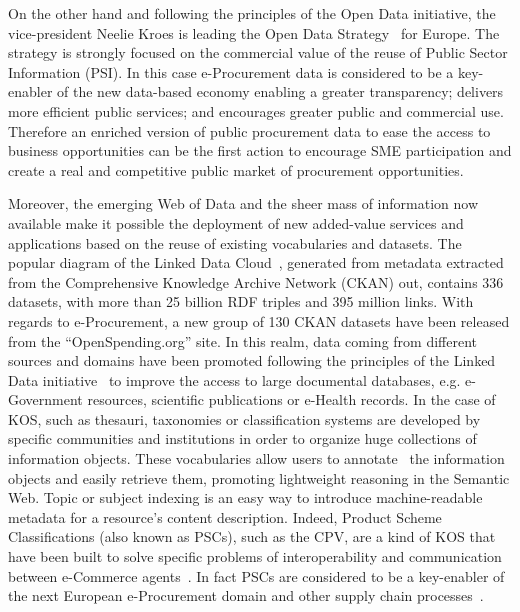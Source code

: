 On the other hand and following the principles of the Open Data initiative, the vice-president Neelie Kroes is 
leading the Open Data Strategy~\cite{d2003} for Europe. The strategy is strongly focused on the commercial 
value of the reuse of Public Sector Information (PSI). In this case e-Procurement data is considered to be 
a key-enabler of the new data-based economy enabling a greater transparency; delivers more efficient public services; and encourages 
greater public and commercial use. Therefore an enriched version of public procurement data to ease the access 
to business opportunities can be the first action to encourage SME participation and create a real and competitive 
public market of procurement opportunities. 


Moreover, the emerging Web of Data and the sheer mass of information now available make it possible the deployment of new 
added-value services and applications based on the reuse of existing vocabularies and datasets. 
The popular diagram of the Linked Data Cloud~\cite{linked-data-cloud}, generated from metadata extracted from the 
Comprehensive Knowledge Archive Network (CKAN) out, contains $336$ datasets, with more than 25 billion RDF triples and 395 million links. 
With regards to e-Procurement, a new group of 130 CKAN datasets have been released from the ``OpenSpending.org'' site. In this realm, 
data coming from different sources and domains have been promoted following the principles of the 
Linked Data initiative~\cite{Berners-Lee-2006} to improve the access to large documental databases, 
e.g. e-Government resources, scientific publications or e-Health records. In the case of KOS, such as thesauri, taxonomies or classification systems 
are developed by specific communities and institutions in order to organize huge collections of information objects. 
These vocabularies allow users to annotate~\cite{Leukel-standard,Leukel-automating,Leukel-comparative} the information objects and easily retrieve them, 
promoting lightweight reasoning in the Semantic Web. Topic or subject indexing is an easy way to introduce machine-readable metadata for a resource's content 
description. Indeed, Product Scheme Classifications (also known as PSCs), such as the CPV, are a kind of KOS that have been built to solve specific problems 
of interoperability and communication between e-Commerce agents~\cite{FenselOmel2001,Leukel-findings}. In fact PSCs are considered to be a key-enabler of 
the next European e-Procurement domain and other supply chain processes~\cite{DBLP:journals/tcci/Alor-HernandezAJPRMBG10}.

